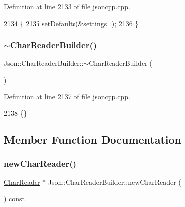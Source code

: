 Definition at line 2133 of file jsoncpp.\+cpp.


\begin{DoxyCode}
2134 \{
2135   \hyperlink{class_json_1_1_char_reader_builder_a03ff031e06aabff989ab4addc87294ab}{setDefaults}(&\hyperlink{class_json_1_1_char_reader_builder_ac69b7911ad64c171c51ebaf2ea26d958}{settings\_});
2136 \}
\end{DoxyCode}
\mbox{\label{class_json_1_1_char_reader_builder_ae8226503f5b947e9d618c39dd992c85c}} 
\subsubsection{\texorpdfstring{$\sim$\+Char\+Reader\+Builder()}{~CharReaderBuilder()}}
{\footnotesize\ttfamily Json\+::\+Char\+Reader\+Builder\+::$\sim$\+Char\+Reader\+Builder (\begin{DoxyParamCaption}{ }\end{DoxyParamCaption})}



Definition at line 2137 of file jsoncpp.\+cpp.


\begin{DoxyCode}
2138 \{\}
\end{DoxyCode}


\subsection{Member Function Documentation}
\mbox{\label{class_json_1_1_char_reader_builder_a3a262fcc76c1eb8eebfd4718fb4e9722}} 
\subsubsection{\texorpdfstring{new\+Char\+Reader()}{newCharReader()}}
{\footnotesize\ttfamily \hyperlink{class_json_1_1_char_reader}{Char\+Reader} $\ast$ Json\+::\+Char\+Reader\+Builder\+::new\+Char\+Reader (\begin{DoxyParamCaption}{ }\end{DoxyParamCaption}) const\hspace{0.3cm}{\ttfamily [virtual]}}



